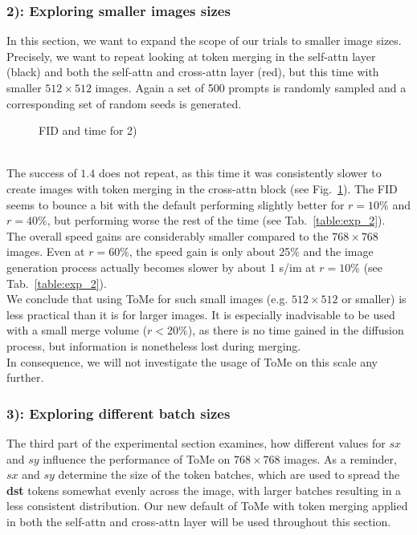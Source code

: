 \subsubsection*{2): Exploring smaller images sizes}
In this section, we want to expand the scope of our trials to smaller image sizes. Precisely, we want to repeat looking at token merging in the self-attn layer (black) and both the self-attn and cross-attn layer (red), but this time with smaller $512 \times 512$ images. Again a set of 500 prompts is randomly sampled and a corresponding set of random seeds is generated.
\begin{figure}[!htb]
    
    
\caption{FID and time for 2)}
\label{fig:exp_2}
\end{figure}\\
The success of \(1.4\) does not repeat, as this time it was consistently slower to create images with token merging in the cross-attn block (see Fig.~\ref{fig:exp_2}). The FID seems to bounce a bit with the default performing slightly better for \(r=10\%\) and \(r=40\%\), but performing worse the rest of the time (see Tab.~\ref{table:exp_2}). \\
The overall speed gains are considerably smaller compared to the \(768 \times 768\) images. Even at \(r=60\%\), the speed gain is only about 25\% and the image generation process actually becomes slower by about 1 s/im at \(r=10\%\) (see Tab.~\ref{table:exp_2}).\\
We conclude that using ToMe for such small images (e.g. $512 \times 512$ or smaller) is less practical than it is for larger images. It is especially inadvisable to be used with a small merge volume (\(r<20\%\)), as there is no time gained in the diffusion process, but information is nonetheless lost during merging. \\
In consequence, we will not investigate the usage of ToMe on this scale any further.



\subsubsection*{3): Exploring different batch sizes}
The third part of the experimental section examines, how different values for \(sx\) and \(sy\) influence the performance of ToMe on $768 \times 768$ images. As a reminder, \(sx\) and \(sy\) determine the size of the token batches, which are used to spread the \textbf{dst} tokens somewhat evenly across the image, with larger batches resulting in a less consistent distribution. Our new default of ToMe with token merging applied in both the self-attn and cross-attn layer will be used throughout this section.



